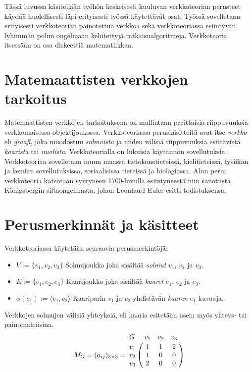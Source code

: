 Tässä luvussa käsitellään työhön keskeisesti kuuluvan verkkoteorian perusteet käydää huolellisesti läpi erityisesti työssä käytettävät osat.
Työssä sovelletaan erityisesti verkkoteorian painotettua verkkoa sekä verkkoteoriassa esiintyvän lyhimmän polun ongelmaan kehitettyjä ratkaisualgoritmeja.
Verkkoteoria itsessään on osa diskeettiä matematiikkaa.

\section{Matemaattisten verkkojen tarkoitus} \label{09_matemaattisten_verkkojen_tarkoitus}

Matemaattisten verkkojen tarkoituksena on mallintaan parittaisia riippuvuuksia verkkomaisessa objektijoukossa.
Verkkoteoriassa peruskäsitteitä ovat itse \emph{verkko} eli \emph{graafi}, joka muodostuu \emph{solmuista} ja niiden välisiä riippuvuuksia esittävistä \emph{kaarista} tai \emph{nuolista}.
Verkkoteorialla on lukuisia käytännön sovellutuksia. Verkkoteoriaa sovelletaan muun muassa tietokonetieteissä, kielitieteissä, fysiikan ja kemian sovellutuksissa, sosiaalisissa tieteissä ja biologiassa.
Alun perin verkkoteoria katsotaan syntyneen 1700-luvulla esiintyneestä niin sanotusta Königsbergin siltaongelmasta, johon Leonhard Euler esitti todistuksensa.

\section{Perusmerkinnät ja käsitteet} \label{09_perusmerkinnat_ja_kasitteet}

Verkkoteoriassa käytetään seuraavia perusmerkintöjä:
\begin{itemize}
  \item \(V := \{v_1, v_2, v_3\}\) Solmujoukko joka sisältää \emph{solmut} \(v_1\), \(v_2\) ja \(v_3\).
  \item \(E := \{e_1, e_2, e_3\}\) Kaarijoukko joka sisältää \emph{kaaret} \(e_1\), \(e_2\) ja \(e_3\).
  \item \(\phi(e_1) := \langle v_1, v_2 \rangle\) Kaariparin \(v_1\) ja \(v_2\) yhdistävän \emph{kaaren} \(e_1\) kuvaaja.
\end{itemize}

Verkkojen solmujen välisiä yhteyksiä, eli kaaria esitetään usein myös yhteys- tai painomatriisina.
\[
  M_G = (a_{ij})_{3\times3} =
  \bordermatrix{
    G & v_1 & v_2 & v_3 \cr
    v_1 & 1 & 1 & 2 \cr
    v_2 & 1 & 0 & 0 \cr
    v_3 & 2 & 0 & 0 \cr
  }
\]


